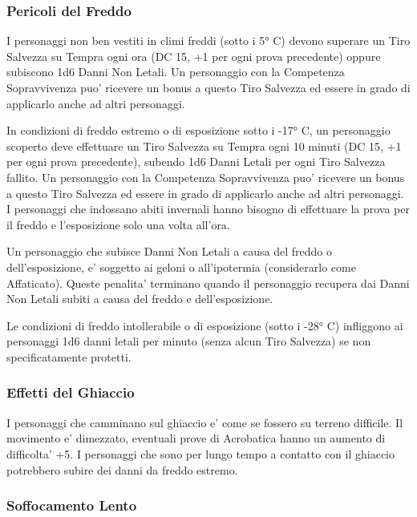 \documentclass[a4paper,11pt,twoside,openany]{dndbook}
\begin{document}
{\subsubsection{Pericoli del Freddo}

\label{pericoli-del-freddo}

I personaggi non ben vestiti in climi freddi (sotto i 5° C) devono superare un Tiro Salvezza su Tempra ogni ora (DC 15, +1 per ogni prova precedente) oppure subiscono 1d6 Danni Non Letali. Un personaggio con la Competenza Sopravvivenza puo' ricevere un bonus a questo Tiro Salvezza ed essere in grado di applicarlo anche ad altri personaggi.

In condizioni di freddo estremo o di esposizione sotto i -17° C, un personaggio scoperto deve effettuare un Tiro Salvezza su Tempra ogni 10 minuti (DC 15, +1 per ogni prova precedente), subendo 1d6 Danni Letali per ogni Tiro Salvezza fallito. Un personaggio con la Competenza Sopravvivenza puo' ricevere un bonus a questo Tiro Salvezza ed essere in grado di applicarlo anche ad altri personaggi. I personaggi che indossano abiti invernali hanno bisogno di effettuare la prova per il freddo e l'esposizione solo una volta all'ora.

Un personaggio che subisce Danni Non Letali a causa del freddo o dell'esposizione, e' soggetto ai geloni o all'ipotermia (considerarlo come Affaticato). Queste penalita' terminano quando il personaggio recupera dai Danni Non Letali subiti a causa del freddo e dell'esposizione. 

Le condizioni di freddo intollerabile o di esposizione (sotto i -28° C) infliggono ai personaggi 1d6 danni letali per minuto (senza alcun Tiro Salvezza) se non specificatamente protetti.

\subsubsection{Effetti del Ghiaccio}

I personaggi che camminano sul ghiaccio e' come se fossero su terreno difficile. Il movimento e' dimezzato, eventuali prove di Acrobatica hanno un aumento di difficolta' +5. I personaggi che sono per lungo tempo a contatto con il ghiaccio potrebbero subire dei danni da freddo estremo.

\subsubsection{Soffocamento Lento}

}
\end{document}
